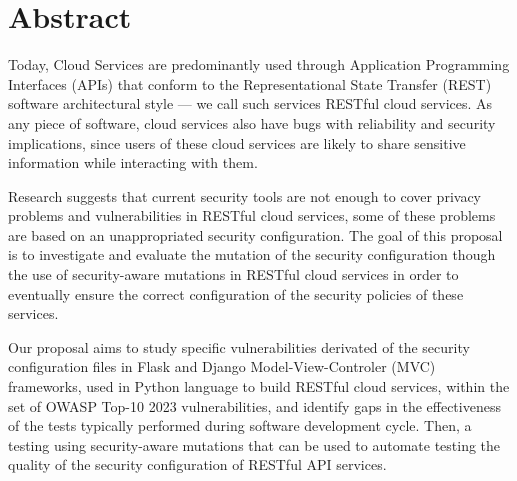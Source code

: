 \chapter*{Abstract}

Today, Cloud Services are predominantly used through Application Programming Interfaces (APIs) that conform to the Representational State Transfer (REST) software architectural style --- we call such services RESTful cloud services.
As any piece of software, cloud services also have bugs with reliability and security implications, since
users of these cloud services are likely to share sensitive information while interacting with them.

Research suggests that current security tools are not enough to cover privacy problems and vulnerabilities in RESTful cloud services, some of these problems are based on an unappropriated security configuration.
The goal of this proposal is to investigate and evaluate the mutation of the security configuration though the use of security-aware mutations in RESTful cloud services in order to eventually ensure the correct configuration of the security policies of these services.

Our proposal aims to study specific vulnerabilities derivated of the security configuration files in Flask and Django Model-View-Controler (MVC) frameworks, used in Python language to build RESTful cloud services, within the set of OWASP Top-10 2023 vulnerabilities, and identify gaps in the effectiveness of the tests typically performed during software development cycle.
Then, a testing using security-aware mutations that can be used to automate testing the quality of the security configuration of RESTful API services.
